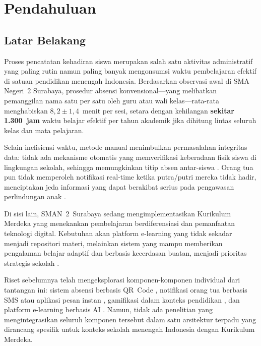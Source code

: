 \documentclass[12pt,a4paper]{article}
\newcommand{\sman}{SMAN~2~Surabaya}
\begin{document}
\begin{abstract}
\vspace{0.5em}
\noindent\textbf{Keywords:} digital attendance; GPS geofencing;
QR code; gamification; Telegram Bot; e-learning; RAG; Merdeka Curriculum;
school information system
\end{abstract}

\tableofcontents
\newpage

\section{Pendahuluan}
\label{sec:intro}

\subsection{Latar Belakang}

Proses pencatatan kehadiran siswa merupakan salah satu aktivitas
administratif yang paling rutin namun paling banyak mengonsumsi waktu
pembelajaran efektif di satuan pendidikan menengah Indonesia.
Berdasarkan observasi awal di SMA Negeri~2 Surabaya, prosedur absensi
konvensional---yang melibatkan pemanggilan nama satu per satu oleh
guru atau wali kelas---rata-rata menghabiskan $8{,}2 \pm 1{,}4$~menit
per sesi, setara dengan kehilangan \textbf{sekitar 1.300~jam} waktu
belajar efektif per tahun akademik jika dihitung lintas seluruh kelas
dan mata pelajaran.

Selain inefisiensi waktu, metode manual menimbulkan permasalahan
integritas data: tidak ada mekanisme otomatis yang memverifikasi
keberadaan fisik siswa di lingkungan sekolah, sehingga memungkinkan
titip absen antar-siswa \citep{wisnumurti2022qr}.
Orang tua pun tidak memperoleh notifikasi real-time ketika putra/putri
mereka tidak hadir, menciptakan jeda informasi yang dapat berakibat
serius pada pengawasan perlindungan anak \citep{priyantoro2021sistem}.

Di sisi lain, \sman{} sedang mengimplementasikan Kurikulum Merdeka
yang menekankan pembelajaran berdiferensiasi dan pemanfaatan teknologi
digital. Kebutuhan akan platform e-learning yang tidak sekadar menjadi
repositori materi, melainkan sistem yang mampu memberikan pengalaman
belajar adaptif dan berbasis kecerdasan buatan, menjadi prioritas
strategis sekolah \citep{kemendikbud2022merdeka}.

Riset sebelumnya telah mengeksplorasi komponen-komponen individual
dari tantangan ini: sistem absensi berbasis QR~Code
\citep{wisnumurti2022qr, kurniawan2023absensi},
notifikasi orang tua berbasis SMS atau aplikasi pesan instan
\citep{nugraha2022telegram},
gamifikasi dalam konteks pendidikan \citep{deterding2011game,
dichev2017gamifying},
dan platform e-learning berbasis AI \citep{chen2020ai}.
Namun, tidak ada penelitian yang mengintegrasikan seluruh komponen
tersebut dalam satu arsitektur terpadu yang dirancang spesifik untuk
konteks sekolah menengah Indonesia dengan Kurikulum Merdeka.
\end{document}
